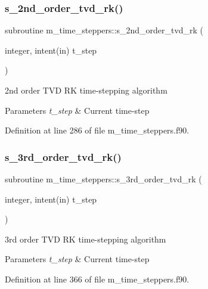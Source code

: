 \subsubsection{\texorpdfstring{s\+\_\+2nd\+\_\+order\+\_\+tvd\+\_\+rk()}{s\_2nd\_order\_tvd\_rk()}}
{\footnotesize\ttfamily subroutine m\+\_\+time\+\_\+steppers\+::s\+\_\+2nd\+\_\+order\+\_\+tvd\+\_\+rk (\begin{DoxyParamCaption}\item[{integer, intent(in)}]{t\+\_\+step }\end{DoxyParamCaption})}



2nd order T\+VD RK time-\/stepping algorithm 


\begin{DoxyParams}{Parameters}
{\em t\+\_\+step} & Current time-\/step \\
\hline
\end{DoxyParams}


Definition at line 286 of file m\+\_\+time\+\_\+steppers.\+f90.

\mbox{\label{namespacem__time__steppers_a1cc10f406268344cc54a55159c4ff08f}} 
\subsubsection{\texorpdfstring{s\+\_\+3rd\+\_\+order\+\_\+tvd\+\_\+rk()}{s\_3rd\_order\_tvd\_rk()}}
{\footnotesize\ttfamily subroutine m\+\_\+time\+\_\+steppers\+::s\+\_\+3rd\+\_\+order\+\_\+tvd\+\_\+rk (\begin{DoxyParamCaption}\item[{integer, intent(in)}]{t\+\_\+step }\end{DoxyParamCaption})}



3rd order T\+VD RK time-\/stepping algorithm 


\begin{DoxyParams}{Parameters}
{\em t\+\_\+step} & Current time-\/step \\
\hline
\end{DoxyParams}


Definition at line 366 of file m\+\_\+time\+\_\+steppers.\+f90.

